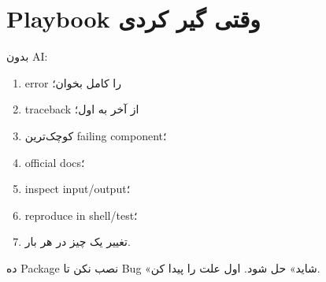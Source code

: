 \section{Playbook وقتی گیر کردی}

بدون AI:
\begin{enumerate}
  \item error را کامل بخوان؛
  \item traceback از آخر به اول؛
  \item کوچک‌ترین failing component؛
  \item official docs؛
  \item inspect input/output؛
  \item reproduce in shell/test؛
  \item تغییر یک چیز در هر بار.
\end{enumerate}

\begin{warningbox}
ده Package نصب نکن تا Bug «شاید» حل شود. اول علت را پیدا کن.
\end{warningbox}
